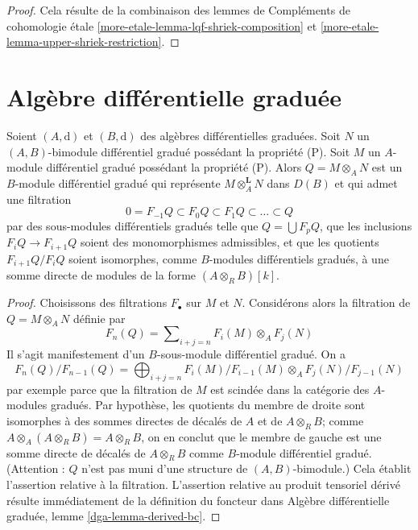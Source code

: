 \begin{proof}
Cela résulte de la combinaison des lemmes de Compléments de cohomologie étale
\ref{more-etale-lemma-lqf-shriek-composition} et
\ref{more-etale-lemma-upper-shriek-restriction}.
\end{proof}
\section{Algèbre différentielle graduée}
\label{section-dga}


\begin{lemma}
\label{lemma-P-not-preserved-base-change}
Soient $(A, \text{d})$ et $(B, \text{d})$ des algèbres différentielles graduées.
Soit $N$ un $(A, B)$-bimodule différentiel gradué possédant la propriété
(P). Soit $M$ un $A$-module différentiel gradué possédant la propriété (P).
Alors $Q = M \otimes_A N$ est un $B$-module différentiel gradué qui représente
$M \otimes_A^\mathbf{L} N$ dans $D(B)$ et qui admet une filtration
$$
0 = F_{-1}Q \subset F_0Q \subset F_1Q \subset \ldots \subset Q
$$
par des sous-modules différentiels gradués telle que $Q = \bigcup F_pQ$,
que les inclusions $F_iQ \to F_{i + 1}Q$ soient des monomorphismes admissibles,
et que les quotients $F_{i + 1}Q/F_iQ$ soient isomorphes, comme
$B$-modules différentiels gradués, à une somme directe de modules de la forme
$(A \otimes_R B)[k]$.
\end{lemma}

\begin{proof}
Choisissons des filtrations $F_\bullet$ sur $M$ et $N$. Considérons alors la filtration
de $Q = M \otimes_A N$ définie par
$$
F_n(Q) = \sum\nolimits_{i + j = n}
F_i(M) \otimes_A F_j(N)
$$
Il s'agit manifestement d'un $B$-sous-module différentiel gradué. On a
$$
F_n(Q)/F_{n - 1}(Q) =
\bigoplus\nolimits_{i + j = n}
F_i(M)/F_{i - 1}(M) \otimes_A F_j(N)/F_{j - 1}(N)
$$
par exemple parce que la filtration de $M$ est scindée dans la catégorie
des $A$-modules gradués. Par hypothèse, les quotients du membre de droite
sont isomorphes à des sommes directes de décalés de $A$ et de
$A \otimes_R B$; comme
$A \otimes_A (A \otimes_R B) = A \otimes_R B$,
on en conclut que le membre de gauche est une somme directe de décalés
de $A \otimes_R B$ comme $B$-module différentiel gradué.
(Attention : $Q$ n'est pas muni d'une structure de $(A, B)$-bimodule.)
Cela établit l'assertion relative à la filtration.
L'assertion relative au produit tensoriel dérivé résulte immédiatement
de la définition du foncteur dans
Algèbre différentielle graduée, lemme \ref{dga-lemma-derived-bc}.
\end{proof}













